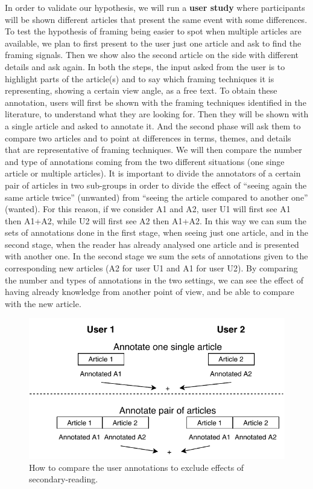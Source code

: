 

In order to validate our hypothesis, we will run a \textbf{user study} where participants will be shown different articles that present the same event with some differences.
To test the hypothesis of framing being easier to spot when multiple articles are available, we plan to first present to the user just one article and ask to find the framing signals. Then we show also the second article on the side with different details and ask again.
In both the steps, the input asked from the user is to highlight parts of the article(s) and to say which framing techniques it is representing, showing a certain view angle, as a free text.
To obtain these annotation, users will first be shown with the framing techniques identified in the literature, to understand what they are looking for.
Then they will be shown with a single article and asked to annotate it. And the second phase will ask them to compare two articles and to point at differences in terms, themes, and details that are representative of framing techniques.
We will then compare the number and type of annotations coming from the two different situations (one singe article or multiple articles).
It is important to divide the annotators of a certain pair of articles in two sub-groups in order to divide the effect of ``seeing again the same article twice'' (unwanted) from ``seeing the article compared to another one'' (wanted).
For this reason, if we consider A1 and A2, user U1 will first see A1 then A1+A2, while U2 will first see A2 then A1+A2.
In this way we can sum the sets of annotations done in the first stage, when seeing just one article, and in the second stage, when the reader has already analysed one article and is presented with another one. In the second stage we sum the sets of annotations given to the corresponding new articles (A2 for user U1 and A1 for user U2).
By comparing the number and types of annotations in the two settings, we can see the effect of having already knowledge from another point of view, and be able to compare with the new article.


\begin{figure}[!htb]
    \centering
    \includegraphics[width=0.7\linewidth]{figures/diagram-user-study-flow.pdf}
    \caption{How to compare the user annotations to exclude effects of secondary-reading.}
    \label{fig:user_study}
\end{figure}


